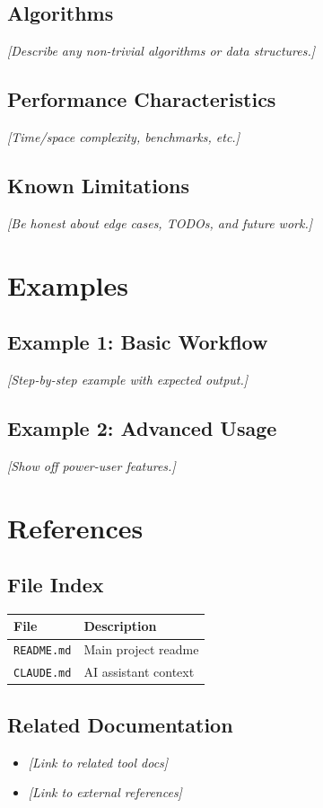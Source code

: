 \documentclass[11pt,a4paper]{report}
\begin{document}
\section{Algorithms}
\textit{[Describe any non-trivial algorithms or data structures.]}

\section{Performance Characteristics}
\textit{[Time/space complexity, benchmarks, etc.]}

\section{Known Limitations}
\textit{[Be honest about edge cases, TODOs, and future work.]}

\chapter{Examples}

\section{Example 1: Basic Workflow}
\textit{[Step-by-step example with expected output.]}

\section{Example 2: Advanced Usage}
\textit{[Show off power-user features.]}

\chapter{References}

\section{File Index}
\begin{longtable}{@{}lp{10cm}@{}}
\toprule
\textbf{File} & \textbf{Description} \\
\midrule
\texttt{README.md} & Main project readme \\
\texttt{CLAUDE.md} & AI assistant context \\
\bottomrule
\end{longtable}

\section{Related Documentation}
\begin{itemize}[leftmargin=2em]
    \item \textit{[Link to related tool docs]}
    \item \textit{[Link to external references]}
\end{itemize}
\end{document}
